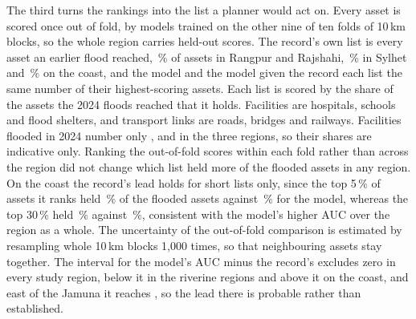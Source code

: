 \documentclass[11pt]{article}
\begin{document}
The third turns the rankings into the list a planner would act on. Every asset is scored once out of fold, by models trained on the other nine of ten folds of 10\,km blocks, so the whole region carries held-out scores. The record's own list is every asset an earlier flood reached, \RRPlanListShare{}\,\% of assets in Rangpur and Rajshahi, \SylhetPlanListShare{}\,\% in Sylhet and \CoastalPlanListShare{}\,\% on the coast, and the model and the model given the record each list the same number of their highest-scoring assets. Each list is scored by the share of the assets the 2024 floods reached that it holds. Facilities are hospitals, schools and flood shelters, and transport links are roads, bridges and railways. Facilities flooded in 2024 number only \RRPlanFacilFlooded{}, \SylhetPlanFacilFlooded{} and \CoastalPlanFacilFlooded{} in the three regions, so their shares are indicative only. Ranking the out-of-fold scores within each fold rather than across the region did not change which list held more of the flooded assets in any region. On the coast the record's lead holds for short lists only, since the top 5\,\% of assets it ranks held \CoastalListFiveRec{}\,\% of the flooded assets against \CoastalListFiveModel{}\,\% for the model, whereas the top 30\,\% held \CoastalListThirtyRec{}\,\% against \CoastalListThirtyModel{}\,\%, consistent with the model's higher AUC over the region as a whole. The uncertainty of the out-of-fold comparison is estimated by resampling whole 10\,km blocks 1,000 times, so that neighbouring assets stay together. The interval for the model's AUC minus the record's excludes zero in every study region, below it in the riverine regions and above it on the coast, and east of the Jamuna it reaches \JamunaOofGapHigh{}, so the lead there is probable rather than established.
\end{document}
